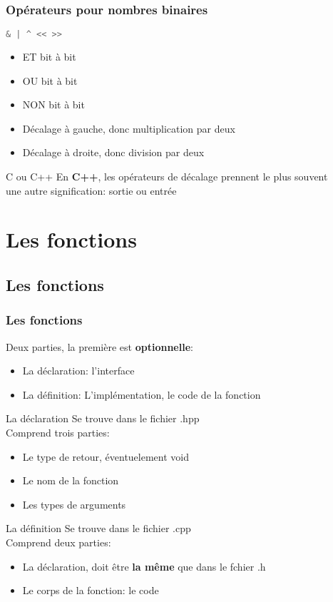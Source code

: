 \documentclass{beamer}
\begin{document}
\begin{frame}[fragile=singleslide,shrink=20]
\frametitle{Opérateurs pour nombres binaires}
\begin{lstlisting}[language=c++]
& | ^ << >>
\end{lstlisting}
\begin{itemize}
\item{ET bit à bit}
\item{OU bit à bit}
\item{NON bit à bit}
\item{Décalage à gauche, donc multiplication par deux}
\item{Décalage à droite, donc division par deux}
\end{itemize}
\begin{block}{C ou C++}
En \textbf{C++}, les opérateurs de décalage prennent le plus souvent \\ 
une autre signification: sortie ou entrée
\end{block}
\end{frame}

\section{Les fonctions}
\subsection{Les fonctions}
\begin{frame}[fragile=singleslide,shrink=20]
\frametitle{Les fonctions}
Deux parties, la première est \textbf{optionnelle}:
\begin{itemize}
\item{La déclaration: l'interface}
\item{La définition: L'implémentation, le code de la fonction}
\end{itemize}

\begin{block}{La déclaration}
Se trouve dans le fichier .hpp \\
Comprend trois parties:
\begin{itemize}
\item{Le type de retour, éventuelement void}
\item{Le nom de la fonction}
\item{Les types de arguments}
\end{itemize}
\end{block}

\begin{block}{La définition}
Se trouve dans le fichier .cpp \\
Comprend deux parties:
\begin{itemize}
\item{La déclaration, doit être \textbf{la même} que dans le fchier .h}
\item{Le corps de la fonction: le code}
\end{itemize}
\end{block}
\end{frame}
\end{document}
